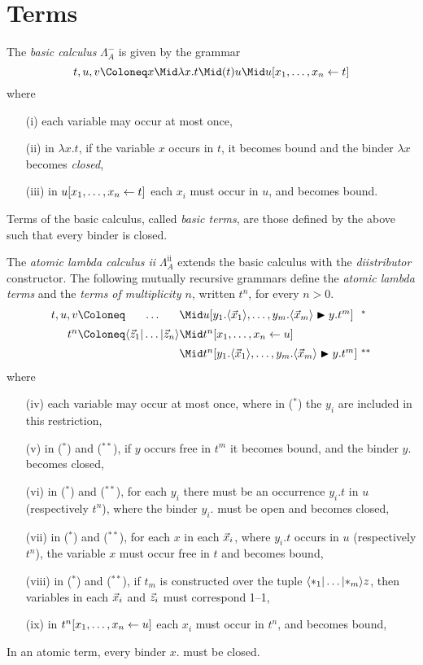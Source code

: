 \documentclass{amsart}
\begin{document}
\section*{Terms}

\begin{definition}
\label{def:basic calculus}
The \emph{basic calculus} $\Lambda_A^-$ is given by the grammar
%
\setMidspace{6pt}
%
\[
t,u,v \Coloneq x
	\Mid		\lambda x.t 
	\Mid		(t)u
	\Mid		u\share xt
\]
%
where
\begin{itemize}
	\item[(i)] each variable may occur at most once, 
	\item[(ii)] in $\lambda x.t$, if the variable $x$ occurs in $t$, it becomes bound and the binder $\lambda x$ becomes \emph{closed},
	\item[(iii)] in $u\share xt$ each $x_i$ must occur in $u$, and becomes bound.
\end{itemize}
%
Terms of the basic calculus, called \emph{basic terms}, are those defined by the above such that every binder is closed.
\end{definition}


\begin{definition}
\label{def:atomic calculus}
The \emph{atomic lambda calculus ii} $\Lambda_A^{\mathrm{ii}}$ extends the basic calculus with the \emph{diistributor} constructor.
%
The following mutually recursive grammars define the \emph{atomic lambda terms} and the \emph{terms of multiplicity $n$}, written $t^n$, for every $n>0$. 
%
\setMidspace{10pt}
%
\[
\begin{array}{@{}r@{}c@{}l@{~}l@{}}
			t,u,v \Coloneq & \ldots  & \Mid u\diistr*{y_1.\tup*{\vv*x_1},\ldots,y_m.\tup*{\vv*x_m}}y{t^m}	 & ^*
\\[5pt]		t^n   \Coloneq & \ttup*z & \Mid t^n\share xu
\\[5pt]							   && \Mid t^n\diistr*{y_1.\tup*{\vv*x_1},\ldots,y_m.\tup*{\vv*x_m}}y{t^m}	 & ^{**}
\end{array}
\]
%
where 
\begin{itemize}
	\item[(iv)] each variable may occur at most once, where in ($^*$) the $y_i$ are included in this restriction,
	\item[(v)]  in ($^*$) and ($^{**}$), if $y$ occurs free in $t^m$ it becomes bound, and the binder $y.$ becomes closed,
	\item[(vi)] in ($^*$) and ($^{**}$), for each $y_i$ there must be an occurrence $y_i.t$ in $u$ (respectively $t^n$), where the binder $y_i.$ must be open and becomes closed,
	\item[(vii)] in ($^*$) and ($^{**}$), for each $x$ in each $\vv*x_i$, where $y_i.t$ occurs in $u$ (respectively $t^n$), the variable $x$ must occur free in $t$ and becomes bound, 
	\item[(viii)] in ($^*$) and ($^{**}$), if $t_m$ is constructed over the tuple $\ttup[m]*z$, then variables in each $\vv*x_i$ and $\vv*z_i$ must correspond 1--1,
	\item[(ix)] in $t^n\share xu$ each $x_i$ must occur in $t^n$, and becomes bound,
\end{itemize}
%
In an atomic term, every binder $x.$ must be closed.
%
\end{definition}
\end{document}
